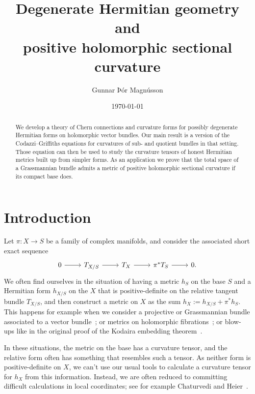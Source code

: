 \documentclass[10pt,a4paper]{amsart}
\author{Gunnar Þór Magnússon}
\date{\today}
\title[Degenerate Hermitian geometry]{Degenerate Hermitian geometry and\\
positive holomorphic sectional curvature}
\theoremstyle{definition}
\begin{document}
\begin{abstract}
We develop a theory of Chern connections and curvature forms for possibly
degenerate Hermitian forms on holomorphic vector bundles.
Our main result is a version of the Codazzi--Griffiths equations for curvatures
of sub- and quotient bundles in that setting.
Those equation can then be used to study the curvature tensors of
honest Hermitian metrics built up from simpler forms.
As an application we prove that the total space of a Grassmannian bundle admits a
metric of positive holomorphic sectional curvature if its compact base does.
\end{abstract}


\maketitle






\section*{Introduction}

Let $\pi : X \to S$ be a family of complex manifolds, and consider the associated short exact sequence
\[
\begin{tikzcd}
0 \ar[r] & T_{X/S} \ar[r] & T_X \ar[r] & \pi^*T_S \ar[r] & 0.
\end{tikzcd}
\]
We often find ourselves in the situation of having a metric $h_S$ on the base
$S$ and a Hermitian form $h_{X/S}$ on the $X$ that is positive-definite on the
relative tangent bundle $T_{X/S}$, and then construct a metric on $X$ as the
sum $h_X := h_{X/S} + \pi^*h_S$. This happens for example when we consider a
projective or Grassmannian bundle associated to a vector
bundle~\cite{alvarez2016positive,alvarez2018projectivized,yang2019hirzebruch};
or metrics on holomorphic fibrations~\cite{calabi-fibres-holomorphes};
or blow-ups like in the original proof of the Kodaira embedding
theorem~\cite{kodaira-embedding}.

In these situations, the metric on the base has a curvature tensor, and the relative form often has something that resembles such a tensor. As neither form is positive-definite on $X$, we can't use our usual tools to calculate a curvature tensor for $h_X$ from this information. Instead, we are often reduced to committing difficult calculations in local coordinates; see for example Chaturvedi and Heier~\cite[Theorem~1.1]{chaturvedi2020hermitian}.
\end{document}
